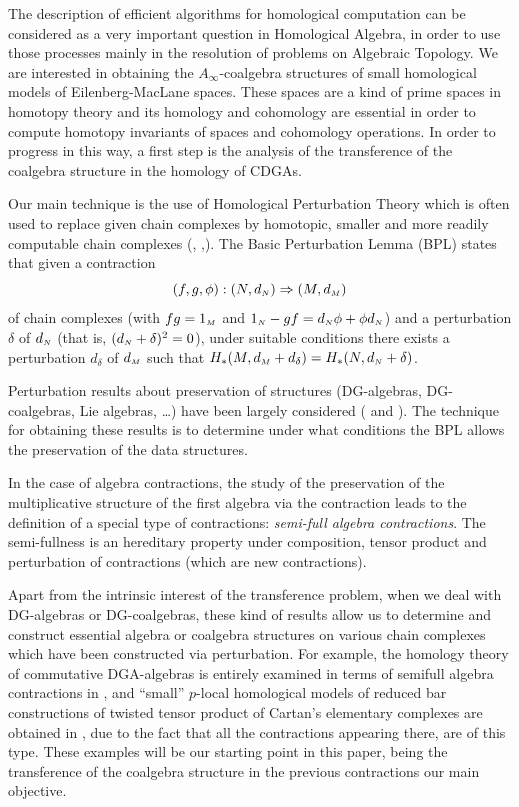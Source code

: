 The description of efficient algorithms for homological computation
can be considered as a very important question in Homological
Algebra, in order to use those processes mainly in the resolution
of problems on Algebraic Topology. We are interested in
obtaining the $A_{\infty}$-coalgebra structures of small
homological models of Eilenberg-MacLane spaces. These spaces are a
kind of prime spaces in homotopy theory and its homology and
cohomology are essential in order to compute homotopy invariants
of spaces and cohomology operations. In order to progress in this
way, a first step is the analysis of the transference of the
coalgebra structure in the homology of CDGAs.

  Our main technique is the use of Homological Perturbation
  Theory which
 is often used to replace given chain
complexes by homotopic, smaller and more readily computable
chain complexes (\cite{Gug72}, \cite{GL89},\cite{GLS91}). The Basic
Perturbation Lemma (BPL) states
that given a contraction
\begin{equation}
(f,g,\phi):(N,d_{\scriptscriptstyle N})\Rightarrow (M,d_{\scriptscriptstyle M})
\label{contraction} \end{equation} of chain complexes (with
$fg=1_{\scriptscriptstyle M}$ and $1_{\scriptscriptstyle N}-gf = d_{\scriptscriptstyle N}\phi + \phi
d_{\scriptscriptstyle N}$) and a perturbation $\delta$ of $d_{\scriptscriptstyle N}$ (that
is, $(d_{\scriptscriptstyle N}+\delta)^{2}=0$), under suitable conditions there
exists a perturbation $d_{\delta}$ of $d_{\scriptscriptstyle M}$ such that
$H_{*}(M,d_{\scriptscriptstyle M}+d_{\delta})=H_* (N,d_{\scriptscriptstyle N}+ \delta)$.


 Perturbation results about preservation of
structures (DG-algebras, DG-coalgebras, Lie algebras, \ldots) have
been largely considered (\cite{GLS91} and \cite{HK}). The technique for obtaining these
results is to determine under what
conditions the BPL allows the
preservation of the data structures.

 In the case of algebra contractions, the study of the preservation
 of the multiplicative structure of the first algebra via the
  contraction
leads to the definition of a special type of contractions:
{\em semi-full algebra contractions}.
The semi-fullness is an hereditary
property under composition, tensor product and perturbation of
contractions (which are new contractions).

Apart from the intrinsic interest of the transference
problem, when we deal with DG-algebras or DG-coalgebras,
these kind of results
allow us to determine and
construct essential algebra or coalgebra structures
on various chain complexes which have been constructed via
perturbation. For example, the
homology theory of commutative DGA-algebras is entirely examined in
terms of semifull algebra contractions in \cite{Moscu},
and  ``small''  $p$-local homological models of
 reduced bar constructions  of
twisted tensor product of Cartan's elementary complexes are
obtained in \cite{NY}, due to the fact that all the contractions
appearing there, are of this type. These examples will be our
starting point in this paper, being the transference  of the
coalgebra structure in  the previous
contractions our main objective.


